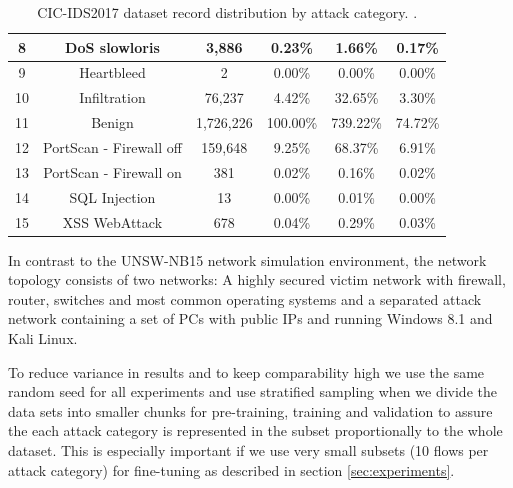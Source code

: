 \begin{table}[H]
\begin{tabular}{cccccc}
		8  & DoS slowloris           & 3,886        & 0.23\%                 & 1.66\%                          & 0.17\%                    \\ \midrule
		9  & Heartbleed              & 2           & 0.00\%                 & 0.00\%                          & 0.00\%                    \\ \midrule
		10  & Infiltration            & 76,237       & 4.42\%                 & 32.65\%                         & 3.30\%                    \\ \midrule
		11 & Benign                  & 1,726,226     & 100.00\%               & 739.22\%                        & 74.72\%                   \\ \midrule
		12 & PortScan - Firewall off & 159,648      & 9.25\%                 & 68.37\%                         & 6.91\%                    \\ \midrule
		13 & PortScan - Firewall on  & 381         & 0.02\%                 & 0.16\%                          & 0.02\%                    \\ \midrule
		14 & SQL Injection           & 13          & 0.00\%                 & 0.01\%                          & 0.00\%                    \\ \midrule
		15 & XSS WebAttack           & 678         & 0.04\%                 & 0.29\%                          & 0.03\%                   
	\end{tabular}
	\caption{CIC-IDS2017 dataset record distribution by attack category. \cite{cic_ids_2017_analysis}.}
	\label{table:methodology:datasets:cic_ids_2017_categories}
\end{table}

In contrast to the UNSW-NB15 network simulation environment, the network topology consists of two networks: A highly secured victim network with firewall, router, switches and most common operating systems and a separated attack network containing a set of PCs with public IPs and running Windows 8.1 and Kali Linux.

To reduce variance in results and to keep comparability high we use the same random seed for all experiments and use stratified sampling when we divide the data sets into smaller chunks for pre-training, training and validation to assure the each attack category is represented in the subset proportionally to the whole dataset. This is especially important if we use very small subsets (10 flows per attack category) for fine-tuning as described in section \ref{sec:experiments}. 

